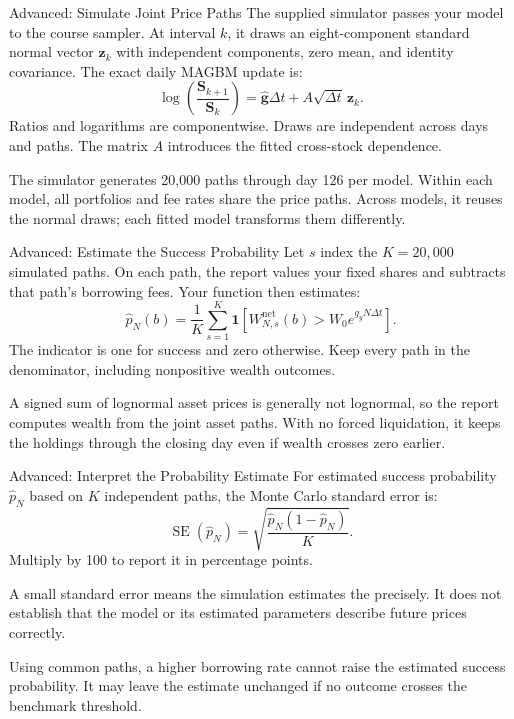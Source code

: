 \documentclass[aspectratio=169,11pt]{beamer}
\newcommand{\ghat}{\widehat{\mathbf{g}}}
\begin{document}
\begin{frame}{Advanced: Simulate Joint Price Paths}
The supplied simulator passes your model to the course sampler. At interval
$k$, it draws an eight-component standard normal vector $\mathbf z_k$ with
independent components, zero mean, and identity covariance. The exact daily
MAGBM update is:
\[
 \log\!\left(\frac{\mathbf S_{k+1}}{\mathbf S_k}\right)
 =\ghat\Delta t+A\sqrt{\Delta t}\,\mathbf z_k.
\]
Ratios and logarithms are componentwise. Draws are independent across days
and paths. The matrix $A$ introduces the fitted cross-stock dependence.

\vspace{0.8em}
The simulator generates 20,000 paths through day 126 per model. Within each
model, all portfolios and fee rates share the price paths. Across models, it
reuses the normal draws; each fitted model transforms them differently.
\end{frame}

\begin{frame}{Advanced: Estimate the Success Probability}
Let $s$ index the $K=20{,}000$ simulated paths. On each path, the report
values your fixed shares and subtracts that path's borrowing fees. Your
function then estimates:
\[
 \hat p_N(b)=\frac1K\sum_{s=1}^K
 \mathbf1\!\left[W_{N,s}^{\mathrm{net}}(b)>W_0e^{g_yN\Delta t}\right].
\]
The indicator is one for success and zero otherwise. Keep every path in
the denominator, including nonpositive wealth outcomes.

\vspace{0.8em}
A signed sum of lognormal asset prices is generally not lognormal, so the
report computes wealth from the joint asset paths. With no forced liquidation,
it keeps the holdings through the closing day even if wealth crosses zero earlier.
\end{frame}

\begin{frame}{Advanced: Interpret the Probability Estimate}
For estimated success probability $\hat p_N$ based on $K$ independent paths,
the Monte Carlo standard error is:
\[
 \operatorname{SE}(\hat p_N)=\sqrt{\frac{\hat p_N(1-\hat p_N)}{K}}.
\]
Multiply by 100 to report it in percentage points.

\vspace{0.7em}
A small standard error means the simulation estimates the  precisely. It does not establish that the model or
its estimated parameters describe future prices correctly.

\vspace{0.7em}
Using common paths, a higher borrowing rate cannot raise the estimated
success probability. It may leave the estimate unchanged if no outcome
crosses the benchmark threshold.
\end{frame}
\end{document}
